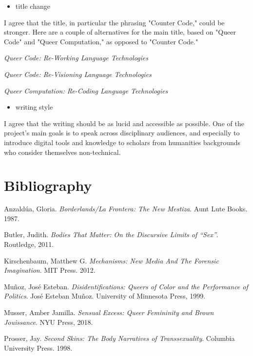 \documentclass[11pt]{article}
\begin{document}
\begin{itemize}
\item title change
\end{itemize}

I agree that the title, in particular the phrasing "Counter Code,"
could be stronger. Here are a couple of alternatives for the main
title, based on "Queer Code" and "Queer Computation," as opposed to
"Counter Code."

\emph{Queer Code: Re-Working Language Technologies}

\emph{Queer Code: Re-Visioning Language Technologies}

\emph{Queer Computation: Re-Coding Language Technologies}

\begin{itemize}
\item writing style
\end{itemize}

I agree that the writing should be as lucid and accessible as
possible. One of the project's main goals is to speak across
disciplinary audiences, and especially to introduce digital tools and
knowledge to scholars from humanities backgrounds who consider
themselves non-technical.

\section{Bibliography}
\label{sec:org2fb733e}

Anzaldúa, Gloria. \emph{Borderlands/La Frontera: The New Mestiza}. Aunt
Lute Books. 1987.

Butler, Judith. \emph{Bodies That Matter: On the Discursive Limits of
“Sex”}. Routledge, 2011.

Kirschenbaum, Matthew G. \emph{Mechanisms: New Media And The Forensic
Imagination}. MIT Press. 2012.

Muñoz, José Esteban. \emph{Disidentifications: Queers of Color and the
Performance of Politics}. José Esteban Muñoz. University of Minnesota
Press, 1999.

Musser, Amber Jamilla. \emph{Sensual Excess: Queer Femininity and Brown
Jouissance}. NYU Press, 2018.

Prosser, Jay. \emph{Second Skins: The Body Narratives of Transsexuality}.
Columbia University Press. 1998.
\end{document}
